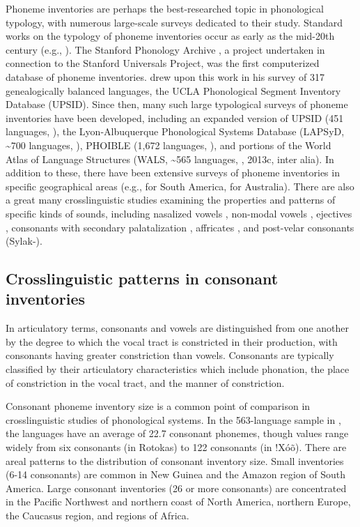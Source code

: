   Phoneme inventories are perhaps the best-researched topic in phonological typology, with numerous large-scale surveys dedicated to their study. Standard works on the typology of phoneme inventories occur as early as the mid-20th century (e.g., \citealt{Hockett1955}). The Stanford Phonology Archive \citep{CrothersEtAl1979}, a project undertaken in connection to the Stanford Universals Project, was the first computerized database of phoneme inventories. \citet{Maddieson1984} drew upon this work in his survey of 317 genealogically balanced languages, the UCLA Phonological Segment Inventory Database (UPSID). Since then, many such large typological surveys of phoneme inventories have been developed, including an expanded version of UPSID (451 languages, \citealt{MaddiesonPrecoda1990}), the Lyon-Albuquerque Phonological Systems Database (LAPSyD, {\textasciitilde}700 languages, \citealt{MaddiesonEtAl2013}), PHOIBLE (1,672 languages, \citealt{MoranEtAl2014}), and portions of the World Atlas of Language Structures (WALS, {\textasciitilde}565 languages, \citealt{Maddieson2013b}, 2013c, inter alia). In addition to these, there have been extensive surveys of phoneme inventories in specific geographical areas (e.g., \citealt{MichaelEtAl2015} for South America, \citealt{GasserBowern2014} for Australia). There are also a great many crosslinguistic studies examining the properties and patterns of specific kinds of sounds, including nasalized vowels \citep{Hajek2013}, non-modal vowels \citep{Gordon1998}, ejectives \citep{Fallon2002}, consonants with secondary palatalization \citep{Hall2000}, affricates \citep{Berns2013}, and post-velar consonants (Sylak-\citealt{Glassman2014}). 

\subsection{Crosslinguistic patterns in consonant inventories}\label{sec:4.1.1}

  In articulatory terms, consonants and vowels are distinguished from one another by the degree to which the vocal tract is constricted in their production, with consonants having greater constriction than vowels. Consonants are typically classified by their articulatory characteristics which include phonation, the place of constriction in the vocal tract, and the manner of constriction.

  Consonant phoneme inventory size is a common point of comparison in crosslinguistic studies of phonological systems. In the 563-language sample in \citet{Maddieson2013b}, the languages have an average of 22.7 consonant phonemes, though values range widely from six consonants (in Rotokas) to 122 consonants (in !Xóõ). There are areal patterns to the distribution of consonant inventory size. Small inventories (6-14 consonants) are common in New Guinea and the Amazon region of South America. Large consonant inventories (26 or more consonants) are concentrated in the Pacific Northwest and northern coast of North America, northern Europe, the Caucasus region, and regions of  Africa.

